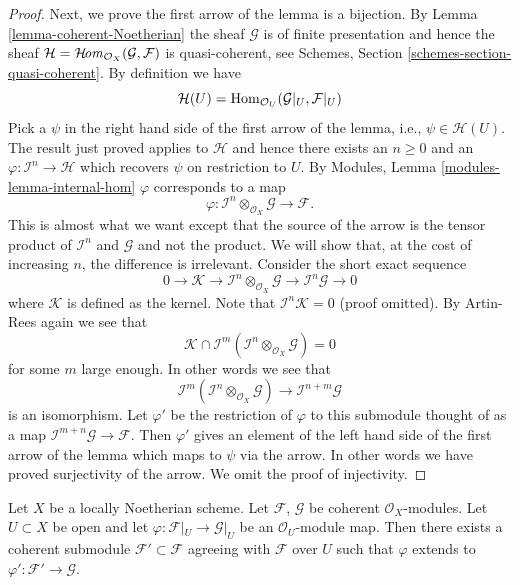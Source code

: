 \begin{proof}
\medskip\noindent
Next, we prove the first arrow of the lemma is a bijection.
By Lemma \ref{lemma-coherent-Noetherian} the sheaf $\mathcal{G}$
is of finite presentation and hence the sheaf
$\mathcal{H} = \mathop{\mathcal{H}\!\mathit{om}}\nolimits_{\mathcal{O}_X}(\mathcal{G}, \mathcal{F})$
is quasi-coherent, see
Schemes, Section \ref{schemes-section-quasi-coherent}.
By definition we have
$$
\mathcal{H}(U)
=
\mathop{\mathrm{Hom}}\nolimits_{\mathcal{O}_U}(\mathcal{G}|_U, \mathcal{F}|_U)
$$
Pick a $\psi$ in the right hand side of the first arrow of the
lemma, i.e.,  $\psi \in \mathcal{H}(U)$. The result just proved applies
to $\mathcal{H}$ and hence there exists an $n \geq 0$ and an
$\varphi : \mathcal{I}^n \to \mathcal{H}$ which recovers
$\psi$ on restriction to $U$. By
Modules, Lemma \ref{modules-lemma-internal-hom}
$\varphi$ corresponds to a map
$$
\varphi :
\mathcal{I}^n \otimes_{\mathcal{O}_X} \mathcal{G}
\longrightarrow
\mathcal{F}.
$$
This is almost what we want except that the source of the arrow
is the tensor product of $\mathcal{I}^n$ and $\mathcal{G}$
and not the product. We will show that, at the cost of increasing $n$,
the difference is irrelevant. Consider the short exact sequence
$$
0 \to \mathcal{K} \to
\mathcal{I}^n \otimes_{\mathcal{O}_X} \mathcal{G} \to
\mathcal{I}^n\mathcal{G} \to 0
$$
where $\mathcal{K}$ is defined as the kernel. Note that
$\mathcal{I}^n\mathcal{K} = 0$ (proof omitted). By Artin-Rees
again we see that
$$
\mathcal{K}
\cap
\mathcal{I}^m(\mathcal{I}^n \otimes_{\mathcal{O}_X} \mathcal{G})
=
0
$$
for some $m$ large enough. In other words we see that
$$
\mathcal{I}^m(\mathcal{I}^n \otimes_{\mathcal{O}_X} \mathcal{G})
\longrightarrow
\mathcal{I}^{n + m}\mathcal{G}
$$
is an isomorphism. Let $\varphi'$ be the restriction of
$\varphi$ to this submodule thought of as a map
$\mathcal{I}^{m + n}\mathcal{G} \to \mathcal{F}$.
Then $\varphi'$ gives an element
of the left hand side of the first arrow of the lemma which
maps to $\psi$ via the arrow. In other words we have proved surjectivity
of the arrow. We omit the proof of injectivity.
\end{proof}

\begin{lemma}
\label{lemma-extend-coherent}
Let $X$ be a locally Noetherian scheme. Let $\mathcal{F}$, $\mathcal{G}$
be coherent $\mathcal{O}_X$-modules. Let $U \subset X$ be open and
let $\varphi : \mathcal{F}|_U \to \mathcal{G}|_U$ be an
$\mathcal{O}_U$-module map. Then there exists a coherent
submodule $\mathcal{F}' \subset \mathcal{F}$ agreeing with
$\mathcal{F}$ over $U$ such that $\varphi$ extends to
$\varphi' : \mathcal{F}' \to \mathcal{G}$.
\end{lemma}

